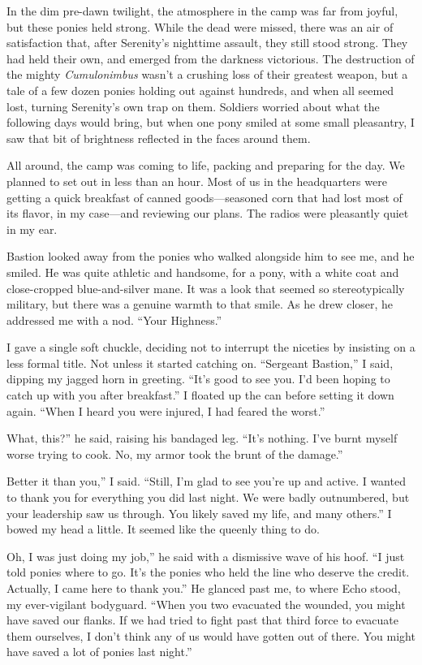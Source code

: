In the dim pre-dawn twilight, the atmosphere in the camp was far from joyful, but these ponies held strong. While the dead were missed, there was an air of satisfaction that, after Serenity’s nighttime assault, they still stood strong. They had held their own, and emerged from the darkness victorious. The destruction of the mighty \textit{Cumulonimbus} wasn’t a crushing loss of their greatest weapon, but a tale of a few dozen ponies holding out against hundreds, and when all seemed lost, turning Serenity’s own trap on them. Soldiers worried about what the following days would bring, but when one pony smiled at some small pleasantry, I saw that bit of brightness reflected in the faces around them.

All around, the camp was coming to life, packing and preparing for the day. We planned to set out in less than an hour. Most of us in the headquarters were getting a quick breakfast of canned goods—seasoned corn that had lost most of its flavor, in my case—and reviewing our plans. The radios were pleasantly quiet in my ear.

Bastion looked away from the ponies who walked alongside him to see me, and he smiled. He was quite athletic and handsome, for a pony, with a white coat and close-cropped blue-and-silver mane. It was a look that seemed so stereotypically military, but there was a genuine warmth to that smile. As he drew closer, he addressed me with a nod. “Your Highness.”

I gave a single soft chuckle, deciding not to interrupt the niceties by insisting on a less formal title. Not unless it started catching on. “Sergeant Bastion,” I said, dipping my jagged horn in greeting. “It’s good to see you. I’d been hoping to catch up with you after breakfast.” I floated up the can before setting it down again. “When I heard you were injured, I had feared the worst.”

\leavevmode{}What, this?” he said, raising his bandaged leg. “It’s nothing. I’ve burnt myself worse trying to cook. No, my armor took the brunt of the damage.”

\leavevmode{}Better it than you,” I said. “Still, I’m glad to see you’re up and active. I wanted to thank you for everything you did last night. We were badly outnumbered, but your leadership saw us through. You likely saved my life, and many others.” I bowed my head a little. It seemed like the queenly thing to do.

\leavevmode{}Oh, I was just doing my job,” he said with a dismissive wave of his hoof. “I just told ponies where to go. It’s the ponies who held the line who deserve the credit. Actually, I came here to thank you.” He glanced past me, to where Echo stood, my ever-vigilant bodyguard. “When you two evacuated the wounded, you might have saved our flanks. If we had tried to fight past that third force to evacuate them ourselves, I don’t think any of us would have gotten out of there. You might have saved a lot of ponies last night.”

